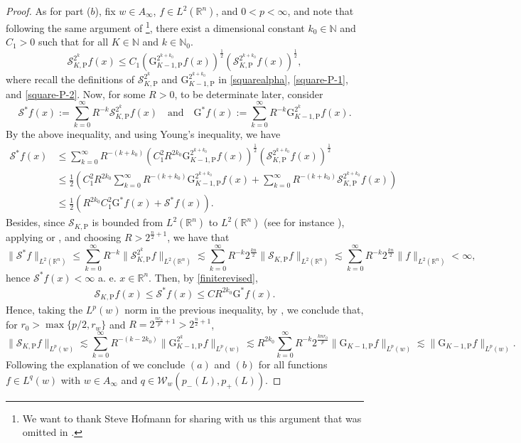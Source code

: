 \documentclass[11pt, a4paper,leqno]{amsart}
\theoremstyle{plain}
\theoremstyle{definition}
\theoremstyle{remark}
\numberwithin{equation}{section}
\def \R{ \mathbb{R} }
\def \N{ \mathbb{N} }
\def \Scal{ \mathcal{S} }
\def \pp{ \mathrm{P} }
\def \Grm{ \mathrm{G} }
\begin{document}
\begin{proof}
As for part ($b$), fix $w\in A_{\infty}$, $f\in L^2(\R^n)$, and $0<p<\infty$, and note that following the same argument of \cite[Lemma 5.4]{HofmannMayboroda}\footnote{We want to thank Steve Hofmann for sharing with us this argument that was omitted in \cite[Lemma 5.4]{HofmannMayboroda}.}, there exist a dimensional constant $k_0\in \N$ and $C_1>0$ such that for all $K\in \N$ and $k\in \N_0$.
$$
\Scal_{K,\pp}^{2^{k}}f(x)\leq C_1\left(\Grm_{K-1,\pp}^{2^{k+k_0}}f(x)\right)^{\frac{1}{2}}\left(\Scal_{K,\pp}^{2^{k+k_0}}f(x)\right)^{\frac{1}{2}},
$$
where recall the definitions of $\Scal_{K,\pp}^{2^{k}}$ and $\Grm_{K-1,\pp}^{2^{k+k_0}}$ in \eqref{squarealpha}, \eqref{square-P-1}, and \eqref{square-P-2}.
Now, for some $R>0$, to be determinate later, consider
$$
\Scal^*f(x):=\sum_{k=0}^{\infty}R^{-k}\Scal_{K,\pp}^{2^k}f(x)\quad \textrm{and}\quad
\Grm^*f(x):=\sum_{k=0}^{\infty}R^{-k}\Grm_{K-1,\pp}^{2^k}f(x).
$$
By the above inequality, and using Young's inequality, we have
\begin{align}\label{finiterevised}
\Scal^*f(x)&\leq \sum_{k=0}^{\infty}R^{-(k+k_0)}\left(C_1^2R^{2k_0}
\Grm_{K-1,\pp}^{2^{k+k_0}}f(x)\right)^{\frac{1}{2}}\left(\Scal_{K,\pp}^{2^{k+k_0}}f(x)\right)^{\frac{1}{2}}
\\\nonumber
&\leq
\frac{1}{2}\left(C_1^2R^{2k_0}\sum_{k=0}^{\infty}R^{-(k+k_0)}
\Grm_{K-1,\pp}^{2^{k+k_0}}f(x)+\sum_{k=0}^{\infty}R^{-(k+k_0)}
\Scal_{K,\pp}^{2^{k+k_0}}f(x)\right)
\\\nonumber
&\leq \frac{1}{2}\left(R^{2k_0}C_1^2\Grm^*f(x)+\Scal^*f(x)\right).
\end{align}
Besides, since $\Scal_{K,\pp}$ is bounded from $L^2(\R^n)$ to $L^2(\R^n)$ (see for instance  \cite{MartellPrisuelos}), applying \cite[Proposition 4, Section 3]{CoifmanMeyerStein} or \cite{Auscherangles}, and choosing $R>2^{\frac{n}{2}+1}$, we have that
$$
\|\Scal^*f\|_{L^2(\R^n)}\leq\sum_{k=0}^{\infty}R^{-k}\|\Scal_{K,\pp}^{2^k}f\|_{L^2(\R^n)}
\lesssim \sum_{k=0}^{\infty}R^{-k}2^{\frac{kn}{2}}\|\Scal_{K,\pp}f\|_{L^2(\R^n)}
\lesssim \sum_{k=0}^{\infty}R^{-k}2^{\frac{kn}{2}}\|f\|_{L^2(\R^n)}<\infty,
$$
hence $\Scal^*f(x)<\infty$ a. e. $x\in \R^n$.
Then, by \eqref{finiterevised},
\begin{align*}
\Scal_{K,\pp}f(x)\leq \Scal^{*}f(x)\leq CR^{2k_0} \Grm^*f(x).
\end{align*}
Hence,  taking the $L^p(w)$ norm in the previous inequality, by \cite[Proposition 3.29]{MartellPrisuelos}, we conclude that,
for $r_0>\max\{p/2,r_w\}$ and $R=2^{\frac{nr_0}{p}+1}>2^{\frac{n}{2}+1}$,
$$
\|\Scal_{K,\pp}f\|_{L^p(w)}\lesssim \sum_{k=0}^{\infty}R^{-(k-2k_0)}\|\Grm_{K-1,\pp}^{2^k}f\|_{L^p(w)}
\lesssim R^{2k_0}\sum_{k=0}^{\infty}R^{-k}2^{\frac{knr_0}{p}}
\|\Grm_{K-1,\pp}f\|_{L^p(w)}\lesssim \|\Grm_{K-1,\pp}f\|_{L^p(w)}.
$$
Following the explanation of \cite[Remark 4.22]{MartellPrisuelos} we conclude $(a)$ and $(b)$ for all functions $f\in L^q(w)$ with $w\in A_{\infty}$ and $q\in \mathcal{W}_w(p_-(L),p_+(L))$.
\end{proof}
\end{document}
